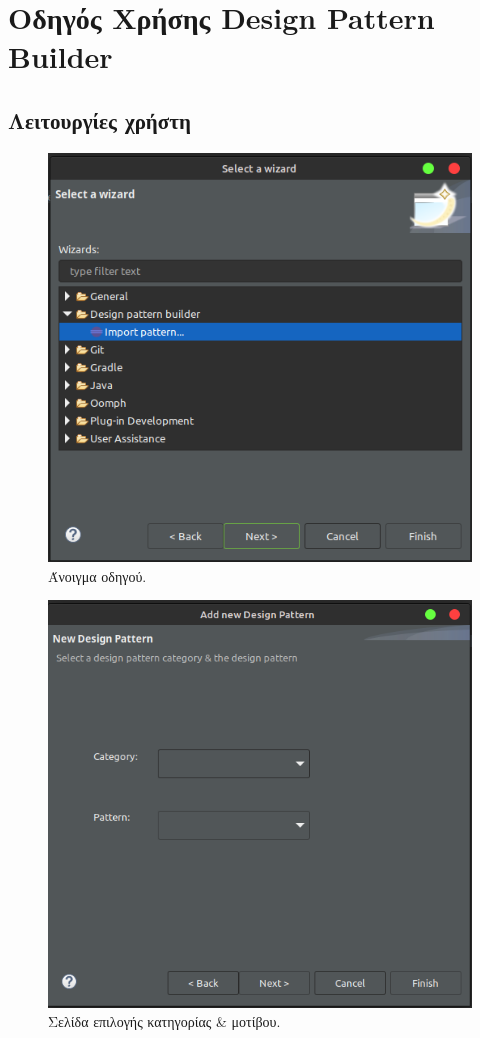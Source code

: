 \chapter{Οδηγός Χρήσης Design Pattern Builder}
\label{ch:manual}


\section{Λειτουργίες χρήστη}
\label{sec:manual}
\begin{figure}[H]
    \centering
    \includegraphics[width=1.0\textwidth]{Figures/open_wizard.png}
    \caption{Άνοιγμα οδηγού.}
    \label{fig:xsd}
\end{figure}
\begin{figure}[H]
    \centering
    \includegraphics[width=1.0\textwidth]{Figures/select_pattern.png}
    \caption{Σελίδα επιλογής κατηγορίας \& μοτίβου.}
    \label{fig:select_pattern}
\end{figure}
